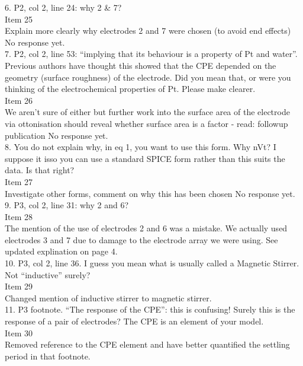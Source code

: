 \documentclass[journal, a4paper]{IEEEtran}
\begin{document}
{6. P2, col 2, line 24: why 2 \& 7?\\
{\color{OliveGreen}
    Item 25\\
    {\color{Red} Explain more clearly why electrodes 2 and 7 were chosen (to avoid end effects)}
    No response yet.
}\\

7. P2, col 2, line 53: ``implying that its behaviour is a property of Pt and water''. Previous authors have thought this showed that the CPE depended on the geometry (surface roughness) of the electrode. Did you mean that, or were you thinking of the electrochemical properties of Pt. Please make clearer.\\
{\color{OliveGreen}
    Item 26\\
    {\color{Red} We aren't sure of either but further work into the surface area of the electrode via ottonisation should reveal whether surface area is a factor - read: followup publication}
    No response yet.
}\\

8. You do not explain why, in eq 1, you want to use this form. Why nVt? I suppose it isso you can use a standard SPICE form rather than this suits the data. Is that right?\\
{\color{OliveGreen} 
    Item 27\\
    {\color{Red} Investigate other forms, comment on why this has been chosen}
    No response yet.
}\\

9. P3, col 2, line 31: why 2 and 6?\\
{\color{OliveGreen}
    Item 28\\
    The mention of the use of electrodes 2 and 6 was a mistake. We actually used electrodes 3 and 7 due to damage to the electrode array we were using. See updated explination on page 4.
}\\

10. P3, col 2, line 36. I guess you mean what is usually called a Magnetic Stirrer. Not ``inductive'' surely?\\
{\color{OliveGreen} 
    Item 29\\
    Changed mention of inductive stirrer to magnetic stirrer.
}\\

11. P3 footnote. ``The response of the CPE'': this is confusing! Surely this is the response of a pair of electrodes? The CPE is an element of your model.\\
{\color{OliveGreen} 
    Item 30\\
    Removed reference to the CPE element and have better quantified the settling period in that footnote.
}\\

}
\end{document}
